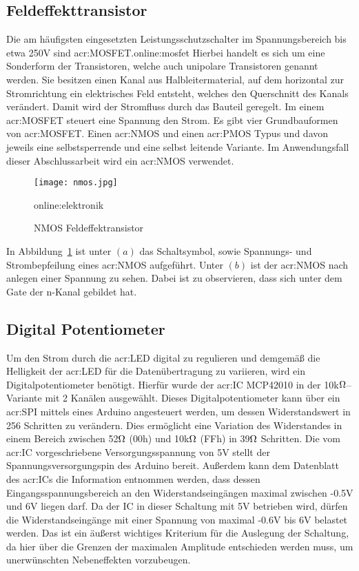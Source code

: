 \newpage
\subsection{Feldeffekttransistor}
\label{subsec:mosfet}
Die am häufigsten eingesetzten Leistungsschutzschalter im Spannungsbereich bis etwa 250V sind \gls{acr:MOSFET}.\gls{online:mosfet} Hierbei handelt es sich um eine Sonderform der Transistoren, welche auch unipolare Transistoren genannt werden. Sie besitzen einen Kanal aus Halbleitermaterial, auf dem horizontal zur Stromrichtung ein elektrisches Feld entsteht, welches den Querschnitt des Kanals verändert. Damit wird der Stromfluss durch das Bauteil geregelt. Im einem \gls{acr:MOSFET} steuert eine Spannung den Strom. Es gibt vier Grundbauformen von \gls{acr:MOSFET}. Einen \gls{acr:NMOS} und einen \gls{acr:PMOS} Typus und davon jeweils eine selbstsperrende und eine selbst leitende Variante. Im Anwendungsfall dieser Abschlussarbeit wird ein \gls{acr:NMOS} verwendet.\cite{heringElektrotechnikUndElektronik2018} 
\newline
\newline

\begin{figure}[H]
	\centering
	\texttt{[image: nmos.jpg]}
	\caption[NMOS Feldeffektransistor]{NMOS Feldeffektransistor} 
	\gls{online:elektronik}
	\label{fig:nmos}
\end{figure}


In Abbildung~\ref{fig:nmos} ist unter $(a)$ das Schaltsymbol, sowie Spannungs- und Strombepfeilung eines \gls{acr:NMOS} aufgeführt. Unter $(b)$ ist der \gls{acr:NMOS} nach anlegen einer Spannung zu sehen. Dabei ist zu observieren, dass sich unter dem Gate der n-Kanal gebildet hat. 
\newpage
\subsection{Digital Potentiometer}
\label{subsec:digipot}

Um den Strom durch die \gls{acr:LED} digital zu regulieren und demgemäß die Helligkeit der \gls{acr:LED} für die Datenübertragung zu variieren, wird ein Digitalpotentiometer benötigt. Hierfür wurde der \gls{acr:IC} MCP42010 in der 10k$\ohm$–Variante mit 2 Kanälen ausgewählt. Dieses Digitalpotentiometer kann über ein \gls{acr:SPI} mittels eines Arduino angesteuert werden, um dessen Widerstandswert in 256 Schritten zu verändern. Dies ermöglicht eine Variation des Widerstandes in einem Bereich zwischen 52$\ohm$ (00h) und 10k$\ohm$ (FFh) in 39$\ohm$ Schritten. 
Die vom \gls{acr:IC} vorgeschriebene Versorgungsspannung von 5V stellt der Spannungsversorgungspin des Arduino bereit. Außerdem kann dem Datenblatt des \gls{acr:IC}s die Information entnommen werden, dass dessen Eingangsspannungsbereich an den Widerstandseingängen maximal zwischen -0.5V und 6V liegen darf. Da der IC in dieser Schaltung mit 5V betrieben wird, dürfen die Widerstandseingänge mit einer Spannung von maximal -0.6V bis 6V belastet werden. Das ist ein äußerst wichtiges Kriterium für die Auslegung der Schaltung, da hier über die Grenzen der maximalen Amplitude entschieden werden muss, um unerwünschten Nebeneffekten vorzubeugen.


